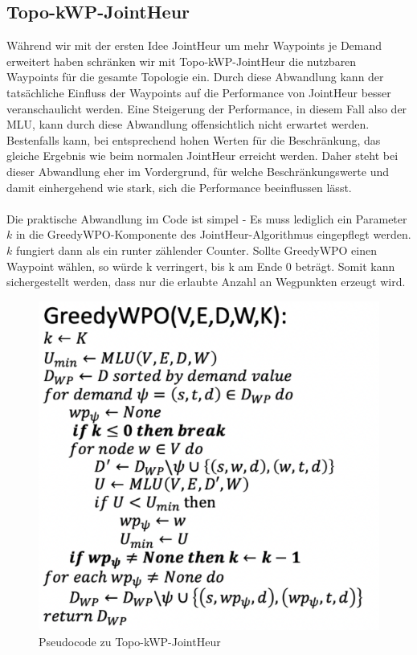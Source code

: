 \documentclass[sigconf,noacm,review]{acmart}
\begin{document}
\subsection{Topo-kWP-JointHeur}
Während wir mit der ersten Idee JointHeur um mehr Waypoints je Demand erweitert haben schränken wir mit Topo-kWP-JointHeur die nutzbaren Waypoints für die gesamte Topologie ein.
Durch diese Abwandlung kann der tatsächliche Einfluss der Waypoints auf die Performance von JointHeur besser veranschaulicht werden. Eine Steigerung der Performance, in diesem Fall also der MLU, kann durch diese Abwandlung offensichtlich nicht erwartet werden. 
Bestenfalls kann, bei entsprechend hohen Werten für die Beschränkung, das gleiche Ergebnis wie beim normalen JointHeur erreicht werden.
Daher steht bei dieser Abwandlung eher im Vordergrund, für welche Beschränkungswerte und damit einhergehend wie stark, sich die Performance beeinflussen lässt. \\
\\
Die praktische Abwandlung im Code ist simpel - Es muss lediglich ein Parameter $k$ in die 
GreedyWPO-Komponente des JointHeur-Algorithmus eingepflegt werden. $k$ fungiert dann als ein runter zählender Counter. Sollte GreedyWPO
einen Waypoint wählen, so würde k verringert, bis k am Ende 0 beträgt. Somit kann sichergestellt werden, dass nur die
erlaubte Anzahl an Wegpunkten erzeugt wird.
\\
\begin{figure}[h]
  \centering
  \includegraphics[width=\linewidth]{abbildungen/pseudo2}
  \caption{Pseudocode zu Topo-kWP-JointHeur}
\end{figure}
\end{document}
